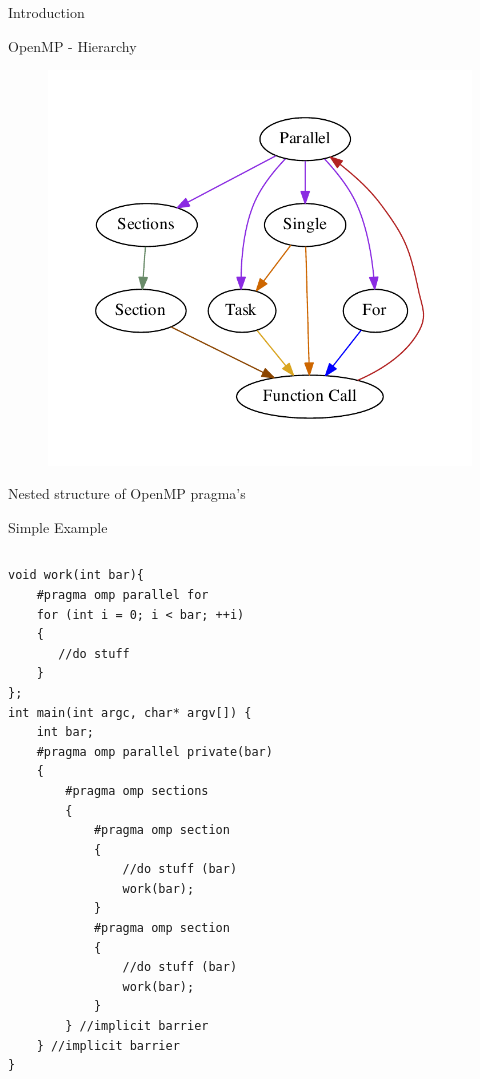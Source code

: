 \documentclass[xcolor=dvipsnames]{beamer}
\begin{document}
\begin{section}{Introduction}
\begin{frame}{\hskip 0.3cm OpenMP - Hierarchy}
\vskip -1cm
\begin{figure}
\centering
\includegraphics[scale = 0.7]{ompstructure}

\end{figure}
\vskip -1cm
Nested structure of OpenMP pragma's

\end{frame}


\begin{frame}[fragile]{\hskip 0.3cm Simple Example}

\begin{columns}

\begin{column}{5cm}
\begin{lstlisting}[language=CCC]
void work(int bar){
    #pragma omp parallel for
    for (int i = 0; i < bar; ++i)
    {
       //do stuff
    }  
};
int main(int argc, char* argv[]) {
    int bar;
    #pragma omp parallel private(bar)
    {
        #pragma omp sections
        {
            #pragma omp section
            {   
                //do stuff (bar)
                work(bar);
            }
            #pragma omp section
            {
                //do stuff (bar)
                work(bar);
            }
        } //implicit barrier 
    } //implicit barrier 
}
\end{lstlisting}


\end{column}
\end{columns}
\end{frame}
\end{section}
\end{document}
